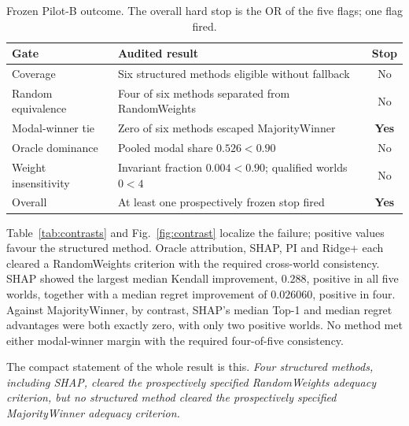 \documentclass[runningheads,orivec]{llncs}
\begin{document}
\begin{table}[t]
\centering
\caption{Frozen Pilot-B outcome. The overall hard stop is the OR of the five flags;
one flag fired.}
\label{tab:gateoutcome}
\small
\begin{tabularx}{\linewidth}{@{}lXc@{}}
\toprule
Gate & Audited result & Stop\\
\midrule
Coverage & Six structured methods eligible without fallback & No\\
Random equivalence & Four of six methods separated from RandomWeights & No\\
Modal-winner tie & Zero of six methods escaped MajorityWinner & \textbf{Yes}\\
Oracle dominance & Pooled modal share $0.526<0.90$ & No\\
Weight insensitivity & Invariant fraction $0.004<0.90$; qualified worlds $0<4$ & No\\
\midrule
Overall & At least one prospectively frozen stop fired & \textbf{Yes}\\
\bottomrule
\end{tabularx}
\end{table}

Table~\ref{tab:contrasts} and Fig.~\ref{fig:contrast} localize the failure; positive
values favour the structured method. Oracle attribution, SHAP, PI and Ridge+ each
cleared a RandomWeights criterion with the required cross-world consistency. SHAP
showed the largest median Kendall improvement, $0.288$, positive in all five worlds,
together with a median regret improvement of $0.026060$, positive in four. Against
MajorityWinner, by contrast, SHAP's median Top-1 and median regret advantages were both
exactly zero, with only two positive worlds. No method met either modal-winner margin
with the required four-of-five consistency.

The compact statement of the whole result is this. \emph{Four structured methods,
including SHAP, cleared the prospectively specified RandomWeights adequacy criterion,
but no structured method cleared the prospectively specified MajorityWinner adequacy
criterion.}
\end{document}
